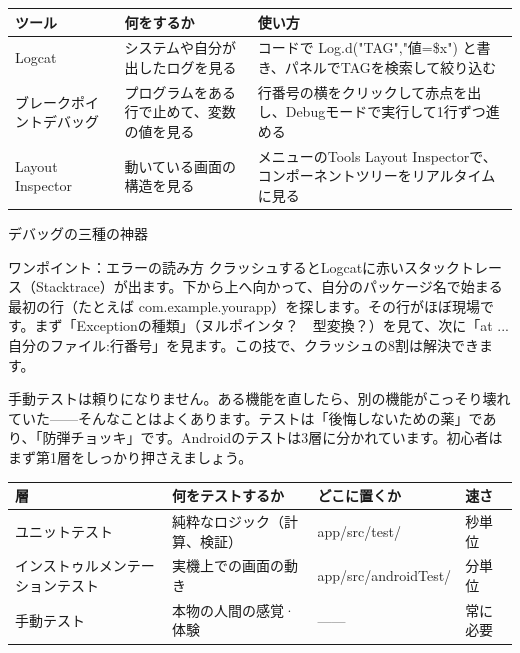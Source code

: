 


\begin{center}
\begin{tabularx}{\linewidth}{|X|X|X|}
\hline
\textbf{ツール} & \textbf{何をするか} & \textbf{使い方} \tabularnewline
\hline
Logcat & システムや自分が出したログを見る & コードで Log.d("TAG","値=\$x") と書き、パネルでTAGを検索して絞り込む \tabularnewline
ブレークポイントデバッグ & プログラムをある行で止めて、変数の値を見る & 行番号の横をクリックして赤点を出し、Debugモードで実行して1行ずつ進める \tabularnewline
Layout Inspector & 動いている画面の構造を見る & メニューのTools Layout Inspectorで、コンポーネントツリーをリアルタイムに見る \tabularnewline
\hline
\end{tabularx}
\end{center}

\begin{center}\small\color{gray}デバッグの三種の神器\end{center}

\begin{tcbinfo}{ワンポイント：エラーの読み方}
クラッシュするとLogcatに赤いスタックトレース（Stacktrace）が出ます。下から上へ向かって、自分のパッケージ名で始まる最初の行（たとえば com.example.yourapp）を探します。その行がほぼ現場です。まず「Exceptionの種類」（ヌルポインタ？　型変換？）を見て、次に「at ... 自分のファイル:行番号」を見ます。この技で、クラッシュの8割は解決できます。

\end{tcbinfo}


手動テストは頼りになりません。ある機能を直したら、別の機能がこっそり壊れていた——そんなことはよくあります。テストは「後悔しないための薬」であり、「防弾チョッキ」です。Androidのテストは3層に分かれています。初心者はまず第1層をしっかり押さえましょう。

\begin{center}
\begin{tabularx}{\linewidth}{|X|X|X|X|}
\hline
\textbf{層} & \textbf{何をテストするか} & \textbf{どこに置くか} & \textbf{速さ} \tabularnewline
\hline
ユニットテスト & 純粋なロジック（計算、検証） & app/src/test/ & 秒単位 \tabularnewline
インストゥルメンテーションテスト & 実機上での画面の動き & app/src/androidTest/ & 分単位 \tabularnewline
手動テスト & 本物の人間の感覚·体験 & —— & 常に必要 \tabularnewline
\hline
\end{tabularx}
\end{center}

